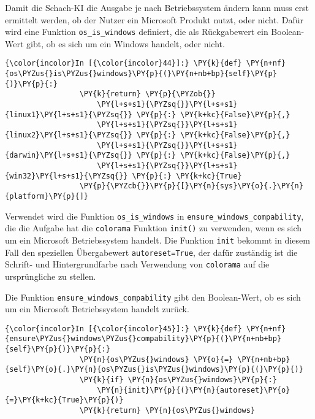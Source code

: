     Damit die Schach-KI die Ausgabe je nach Betriebssystem ändern kann muss
erst ermittelt werden, ob der Nutzer ein Microsoft Produkt nutzt, oder
nicht. Dafür wird eine Funktion \texttt{os\_is\_windows} definiert, die
als Rückgabewert ein Boolean-Wert gibt, ob es sich um ein Windows
handelt, oder nicht.

    \begin{Verbatim}[commandchars=\\\{\}]
{\color{incolor}In [{\color{incolor}44}]:} \PY{k}{def} \PY{n+nf}{os\PYZus{}is\PYZus{}windows}\PY{p}{(}\PY{n+nb+bp}{self}\PY{p}{)}\PY{p}{:}
                 \PY{k}{return} \PY{p}{\PYZob{}}
                     \PY{l+s+s1}{\PYZsq{}}\PY{l+s+s1}{linux1}\PY{l+s+s1}{\PYZsq{}} \PY{p}{:} \PY{k+kc}{False}\PY{p}{,}
                     \PY{l+s+s1}{\PYZsq{}}\PY{l+s+s1}{linux2}\PY{l+s+s1}{\PYZsq{}} \PY{p}{:} \PY{k+kc}{False}\PY{p}{,}
                     \PY{l+s+s1}{\PYZsq{}}\PY{l+s+s1}{darwin}\PY{l+s+s1}{\PYZsq{}} \PY{p}{:} \PY{k+kc}{False}\PY{p}{,}
                     \PY{l+s+s1}{\PYZsq{}}\PY{l+s+s1}{win32}\PY{l+s+s1}{\PYZsq{}} \PY{p}{:} \PY{k+kc}{True}
                 \PY{p}{\PYZcb{}}\PY{p}{[}\PY{n}{sys}\PY{o}{.}\PY{n}{platform}\PY{p}{]}
\end{Verbatim}

    Verwendet wird die Funktion \texttt{os\_is\_windows} in
\texttt{ensure\_windows\_compability}, die die Aufgabe hat die
\texttt{colorama} Funktion \texttt{init()} zu verwenden, wenn es sich um
ein Microsoft Betriebssystem handelt. Die Funktion \texttt{init} bekommt
in diesem Fall den speziellen Übergabewert \texttt{autoreset=True}, der
dafür zuständig ist die Schrift- und Hintergrundfarbe nach Verwendung
von \texttt{colorama} auf die ursprüngliche zu stellen.

Die Funktion \texttt{ensure\_windows\_compability} gibt den
Boolean-Wert, ob es sich um ein Microsoft Betriebssystem handelt zurück.

    \begin{Verbatim}[commandchars=\\\{\}]
{\color{incolor}In [{\color{incolor}45}]:} \PY{k}{def} \PY{n+nf}{ensure\PYZus{}windows\PYZus{}compability}\PY{p}{(}\PY{n+nb+bp}{self}\PY{p}{)}\PY{p}{:}
                 \PY{n}{os\PYZus{}windows} \PY{o}{=} \PY{n+nb+bp}{self}\PY{o}{.}\PY{n}{os\PYZus{}is\PYZus{}windows}\PY{p}{(}\PY{p}{)}
                 \PY{k}{if} \PY{n}{os\PYZus{}windows}\PY{p}{:}
                     \PY{n}{init}\PY{p}{(}\PY{n}{autoreset}\PY{o}{=}\PY{k+kc}{True}\PY{p}{)}
                 \PY{k}{return} \PY{n}{os\PYZus{}windows}
\end{Verbatim}

